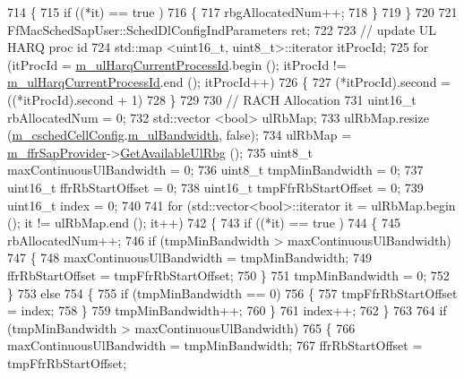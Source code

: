 \begin{DoxyCode}
714     \{
715       \textcolor{keywordflow}{if} ((*it) == true )
716         \{
717           rbgAllocatedNum++;
718         \}
719     \}
720 
721   FfMacSchedSapUser::SchedDlConfigIndParameters ret;
722 
723   \textcolor{comment}{//   update UL HARQ proc id}
724   std::map <uint16\_t, uint8\_t>::iterator itProcId;
725   \textcolor{keywordflow}{for} (itProcId = \hyperlink{classns3_1_1TdTbfqFfMacScheduler_a418d37c6f77b19886fe25e71c103e8b1}{m\_ulHarqCurrentProcessId}.begin (); itProcId != 
      \hyperlink{classns3_1_1TdTbfqFfMacScheduler_a418d37c6f77b19886fe25e71c103e8b1}{m\_ulHarqCurrentProcessId}.end (); itProcId++)
726     \{
727       (*itProcId).second = ((*itProcId).second + 1) %
728     \}
729 
730   \textcolor{comment}{// RACH Allocation}
731   uint16\_t rbAllocatedNum = 0;
732   std::vector <bool> ulRbMap;
733   ulRbMap.resize (\hyperlink{classns3_1_1TdTbfqFfMacScheduler_a3ac3e4b1b3818ff204d6ff6c89c19f4d}{m\_cschedCellConfig}.\hyperlink{structns3_1_1FfMacCschedSapProvider_1_1CschedCellConfigReqParameters_a5ab5b102878e6e7e7727a14af4a64d2f}{m\_ulBandwidth}, \textcolor{keyword}{false});
734   ulRbMap = \hyperlink{classns3_1_1TdTbfqFfMacScheduler_a9db8ce15b6803fe859e5c2908cd00e14}{m\_ffrSapProvider}->\hyperlink{classns3_1_1LteFfrSapProvider_aafd23b22a27ec83e03d54795c122d175}{GetAvailableUlRbg} ();
735   uint8\_t maxContinuousUlBandwidth = 0;
736   uint8\_t tmpMinBandwidth = 0;
737   uint16\_t ffrRbStartOffset = 0;
738   uint16\_t tmpFfrRbStartOffset = 0;
739   uint16\_t index = 0;
740 
741   \textcolor{keywordflow}{for} (std::vector<bool>::iterator it = ulRbMap.begin (); it != ulRbMap.end (); it++)
742     \{
743       \textcolor{keywordflow}{if} ((*it) == true )
744         \{
745           rbAllocatedNum++;
746           \textcolor{keywordflow}{if} (tmpMinBandwidth > maxContinuousUlBandwidth)
747             \{
748               maxContinuousUlBandwidth = tmpMinBandwidth;
749               ffrRbStartOffset = tmpFfrRbStartOffset;
750             \}
751           tmpMinBandwidth = 0;
752         \}
753       \textcolor{keywordflow}{else}
754         \{
755           \textcolor{keywordflow}{if} (tmpMinBandwidth == 0)
756             \{
757               tmpFfrRbStartOffset = index;
758             \}
759           tmpMinBandwidth++;
760         \}
761       index++;
762     \}
763 
764   \textcolor{keywordflow}{if} (tmpMinBandwidth > maxContinuousUlBandwidth)
765     \{
766       maxContinuousUlBandwidth = tmpMinBandwidth;
767       ffrRbStartOffset = tmpFfrRbStartOffset;

\end{DoxyCode}
